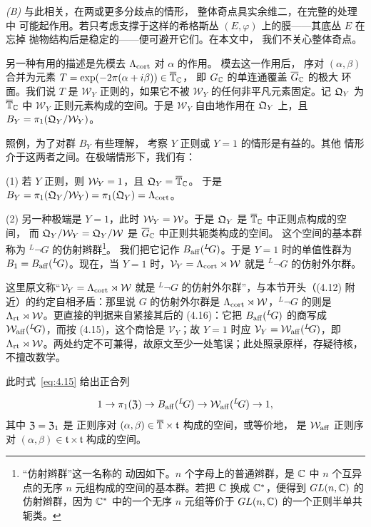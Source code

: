 {\it (B)} 与此相关，在两或更多分歧点的情形，
整体奇点具实余维二，在完整的处理中
可能起作用。若只考虑支撑于这样的希格斯丛
$(E,\varphi)$ 上的膜——其底丛 $E$ 在忘掉
抛物结构后是稳定的——便可避开它们。在本文中，
我们不关心整体奇点。


另一种有用的描述是先模去 $\Lambda_\cort$ 对 $\alpha$ 的作用。
模去这一作用后，
序对 $(\alpha,\beta)$ 合并为元素 $T=\exp(-2\pi(\alpha+i\beta))\in \bar\TT_\C$，
即 $G_\C$ 的单连通覆盖 $\bar G_\C$ 的极大
环面。我们说 $T$ 是 ${\mathcal W}_Y$ 正则的，如果它不被
${\mathcal W}_Y$ 的任何非平凡元素固定。记 $\eurq_Y$ 为
$\bar\TT_\C$ 中 ${\mathcal W}_Y$ 正则元素构成的空间。于是 ${\mathcal W}_Y$
自由地作用在 $\eurq_Y$ 上，且 $B_Y=\pi_1(\eurq_Y/\Weyl_Y)$。

照例，为了对群 $B_Y$ 有些理解，
考察 $Y$ 正则或 $Y=1$ 的情形是有益的。其他
情形介于这两者之间。在极端情形下，我们有：

(1) 若 $Y$ 正则，则 $\Weyl_Y=1$，且 $\eurq_Y=\bar\TT_\C$。
于是 $B_Y=\pi_1(\eurq_Y/\Weyl_Y)=\pi_1(\eurq_Y)=\Lambda_\cort$。

(2) 另一种极端是 $Y=1$，此时 $\Weyl_Y=\Weyl$。于是 $\eurq_Y$
是 $\bar\TT_\C$ 中正则点构成的空间，
而 $\eurq_Y/\Weyl_Y=\eurq_Y/\Weyl$ 是 $\bar G_\C$ 中正则共轭类构成的空间。
这个空间的基本群称为 $^L\neg G$ 的仿射辫群\footnote{“仿射辫群”这一名称的
动因如下。$n$ 个字母上的普通辫群，是 $\C$ 中 $n$ 个互异点的无序
$n$ 元组构成的空间的基本群。若把 $\C$ 换成
$\C^*$，便得到 $GL(n,\C)$ 的仿射辫群，因为 $\C^*$ 中的一个无序
$n$ 元组等价于 $GL(n,\C)$ 的一个正则半单共轭类。}。
我们把它记作
$B_{\rm aff}(^L\neg G)$。于是 $Y=1$ 时的单值性群为 $B_1=
B_{\rm aff}(^L\neg G)$。现在，当 $Y=1$ 时，${\mathcal
V}_Y=\Lambda_\cort\rtimes \Weyl$ 就是 $^L\neg G$ 的仿射外尔群。

\begin{yizhu}[原文疑误]这里原文称“$\mathcal V_Y=\Lambda_\cort\rtimes\Weyl$ 就是 $^L\neg G$ 的仿射外尔群”，与本节开头（(4.12) 附近）的约定自相矛盾：那里说 $G$ 的仿射外尔群是 $\Lambda_\cort\rtimes\Weyl$，$^L\neg G$ 的则是 $\Lambda_\rt\rtimes\Weyl$。更直接的判据来自紧接其后的 (4.16)：它把 $B_{\rm aff}({}^L\neg G)$ 的商写成 $\AffWeyl({}^L\neg G)$，而按 (4.15)，这个商恰是 $\mathcal V_Y$；故 $Y=1$ 时应 $\mathcal V_Y=\AffWeyl({}^L\neg G)$，即 $\Lambda_\rt\rtimes\Weyl$。两处约定不可兼得，故原文至少一处笔误；此处照录原样，存疑待核，不擅改数学。\end{yizhu}
此时式~\eqref{eq:4.15} 给出正合列

\setcounter{equation}{15}
\begin{equation}\label{eq:4.16}
  1\to \pi_1(\eurz)\to B_{\rm aff}(^L\neg G)\to
\AffWeyl(^L\neg G)\to 1,
\end{equation}
 其中 $\eurz=\eurz_1$ 是
正则序对 $(\alpha,\beta)\in\bar\TT\times \mathfrak t$ 构成的空间，或等价地，
是 $\AffWeyl$ 正则序对 $(\alpha,\beta)\in\mathfrak
t\times \mathfrak t$ 构成的空间。

